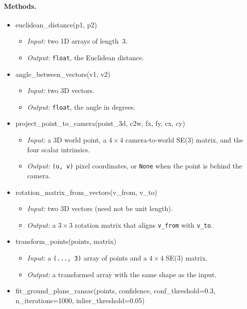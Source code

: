 \documentclass{llmxive}
\providecommand{\apicode}[1]{#1}
\begin{document}
\paragraph{Methods.}
\begin{itemize}[leftmargin=1.5em]
\item \apicode{euclidean_distance(p1, p2)}
  \begin{itemize}
  \item \emph{Input:} two 1D arrays of length~3.
  \item \emph{Output:} \texttt{float}, the Euclidean distance.
  \end{itemize}
\item \apicode{angle_between_vectors(v1, v2)}
  \begin{itemize}
  \item \emph{Input:} two 3D vectors.
  \item \emph{Output:} \texttt{float}, the angle in degrees.
  \end{itemize}
\item \apicode{project_point_to_camera(point_3d, c2w, fx, fy, cx, cy)}
  \begin{itemize}
  \item \emph{Input:} a 3D world point, a $4 \times 4$ camera-to-world SE(3) matrix, and the four scalar intrinsics.
  \item \emph{Output:} \texttt{(u, v)} pixel coordinates, or \texttt{None} when the point is behind the camera.
  \end{itemize}
\item \apicode{rotation_matrix_from_vectors(v_from, v_to)}
  \begin{itemize}
  \item \emph{Input:} two 3D vectors (need not be unit length).
  \item \emph{Output:} a $3 \times 3$ rotation matrix that aligns \texttt{v\_from} with \texttt{v\_to}.
  \end{itemize}
\item \apicode{transform_points(points, matrix)}
  \begin{itemize}
  \item \emph{Input:} a \texttt{(..., 3)} array of points and a $4 \times 4$ SE(3) matrix.
  \item \emph{Output:} a transformed array with the same shape as the input.
  \end{itemize}
\item \apicode{fit_ground_plane_ransac(points, confidence, conf_threshold=0.3, n_iterations=1000, inlier_threshold=0.05)}

\end{itemize}
\end{document}

